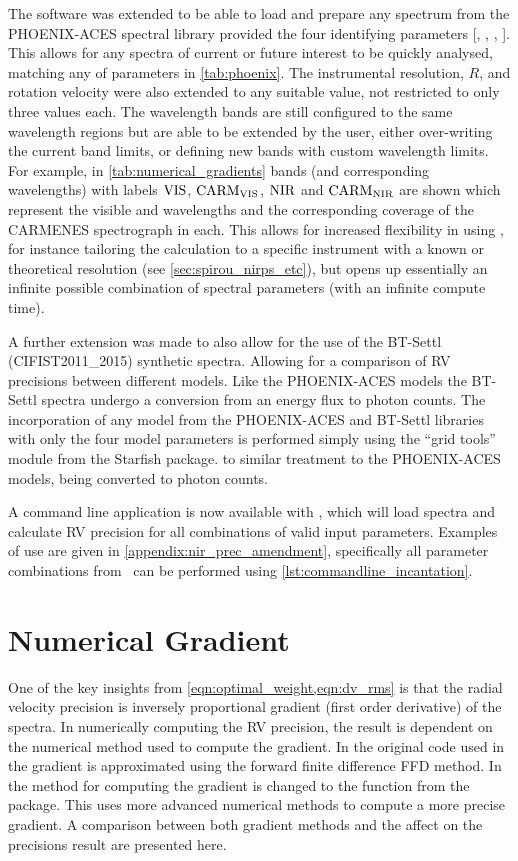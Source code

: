 The software was extended to be able to load and prepare any spectrum from the {PHOENIX-ACES} spectral library provided the four identifying parameters [\Teff, \Logg, \feh{}, \alphafe{}].
This allows for any spectra of current or future interest to be quickly analysed, matching any of parameters in \cref{tab:phoenix}.
The instrumental resolution, \(R\), and rotation velocity \Vsini{} were also extended to any suitable value, not restricted to only three values each.
The \nir{} wavelength bands are still configured to the same wavelength regions but are able to be extended by the user, either over-writing the current band limits, or defining new bands with custom wavelength limits.
For example, in \cref{tab:numerical_gradients} bands (and corresponding wavelengths) with labels \({\rm VIS}\), \(\rm {CARM}_{VIS}\), \(\rm {NIR}\) and \(\rm {CARM}_{NIR}\) are shown which represent the visible and \nir{} wavelengths and the corresponding coverage of the {CARMENES} spectrograph in each.
This allows for increased flexibility in using \eniric{}, for instance tailoring the calculation to a specific instrument with a known or theoretical resolution (see \cref{sec:spirou_nirps_etc}), but opens up essentially an infinite possible combination of spectral parameters (with an infinite compute time).

A further extension was made to also allow for the use of the {BT-Settl} ({CIFIST2011\_2015}) synthetic spectra.
Allowing for a comparison of {RV} precisions between different models.
Like the {PHOENIX-ACES} models the {BT-Settl} spectra undergo a conversion from an energy flux to photon counts.
The incorporation of any model from the {PHOENIX-ACES} and {BT-Settl} libraries with only the four model parameters is performed simply using the ``grid tools'' module from the Starfish package\citep{czekala_constructing_2015}.
to similar treatment to the {PHOENIX-ACES} models, being converted to photon counts.

A command line application is now available with \eniric{}, which will load spectra and calculate {RV} precision for all combinations of valid input parameters.
Examples of use are given in \cref{appendix:nir_prec_amendment}, specifically all parameter combinations from~\citep{figueira_radial_2016} can be performed using \cref{lst:commandline_incantation}.


\section{Numerical Gradient}
\label{sec:numerical_gradient}
One of the key insights from \cref{eqn:optimal_weight,eqn:dv_rms} is that the radial velocity precision is inversely proportional gradient (first order derivative) of the spectra.
In numerically computing the {RV} precision, the result is dependent on the numerical method used to compute the gradient.
In the original code used in~\citet{figueira_radial_2016} the gradient is approximated using the forward finite difference {FFD} method.
In \eniric{} the method for computing the gradient is changed to the \npgradient{} function from the \numpy{} package.
This uses more advanced numerical methods to compute a more precise gradient.
A comparison between both gradient methods and the affect on the precisions result are presented here.

